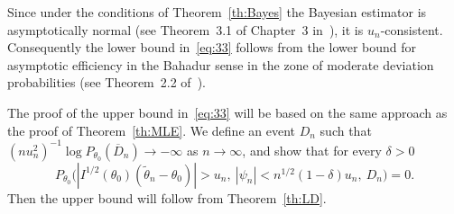\documentclass[11pt,a4paper]{article}
\begin{document}
Since under the conditions of Theorem~\ref{th:Bayes} the Bayesian estimator is asymptotically normal (see Theorem~3.1 of Chapter~3 in~\cite{10}), it is $u_n$-consistent. Consequently the lower bound in~\eqref{eq:33} follows from the lower bound for asymptotic efficiency in the Bahadur sense in the zone of moderate deviation probabilities (see Theorem~2.2 of~\cite{5}).

The proof of the upper bound in~\eqref{eq:33} will be based on the same approach as the proof of Theorem~\ref{th:MLE}. We define an event $D_n$ such that $(nu_n^2)^{-1}\log P_{\theta_0}(\overline{D}_n)\to-\infty$ as $n\to\infty$, and show that for every $\delta>0$
\begin{equation}
P_{\theta_0}\bigl(|I^{1/2}(\theta_0)(\tilde\theta_n-\theta_0)|>u_n,\ |\psi_n|<n^{1/2}(1-\delta)u_n,\ D_n\bigr)=0.
\label{eq:89}
\end{equation}
Then the upper bound will follow from Theorem~\ref{th:LD}.
\end{document}
